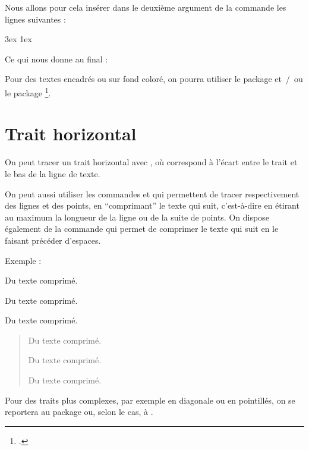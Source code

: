 Nous allons pour cela insérer dans le deuxième argument de la commande  les lignes suivantes :

\begin{latexcode}
\leftmargin 3ex
\rightmargin 1ex
\itshape
\end{latexcode}

Ce qui nous donne au final :

\begin{latexcode}
\makeatletter
\newenvironment{exemple}
               {\list{}{\listparindent 1.5em%
                        \itemindent    \listparindent
                        \leftmargin 3ex
            \rightmargin 1ex
            \itshape
                        \parsep        \z@ \@plus\p@}%
                \item\relax}
               {\endlist}
\makeatother
\end{latexcode}

\begin{plusloins}
Pour des textes encadrés ou sur fond coloré, on pourra utiliser le package  et~/~ou le package \footcites[On peut également consulter][qui regorge d'exemples pratiques de \enquote{mises en boîtes}]{frama}[on consultera en particulier][]{frama_boites}. 
\end{plusloins}

\section{Trait horizontal}\label{filets}

On peut tracer un trait horizontal avec  , où  correspond à l'écart entre le trait et le bas de la ligne de texte.

On peut aussi utiliser les commandes  et  qui permettent de tracer respectivement des lignes et des points, en \enquote{comprimant} le texte qui suit, c'est-à-dire en étirant au maximum la longueur de la ligne ou de la suite de points. On dispose également de la commande \label{hfill} qui permet de comprimer le texte qui suit en le faisant précéder d'espaces.

Exemple :

\begin{latexcode}
\hfill Du texte comprimé.

\hrulefill Du texte comprimé.

\dotfill Du texte comprimé.
\end{latexcode}

\begin{quotation}
\hfill Du texte comprimé.

\hrulefill Du texte comprimé.

\dotfill Du texte comprimé.
\end{quotation}

Pour des traits plus complexes, par exemple en diagonale ou en pointillés, on se reportera au package  ou, selon le cas, à . 



